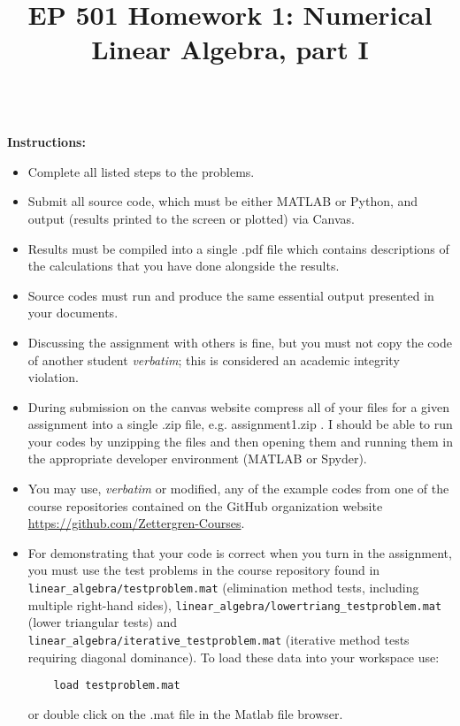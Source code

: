 \documentclass{article}
\begin{document}
\title{EP 501 Homework 1:  Numerical Linear Algebra, part I}

\maketitle

~\\
\textbf{Instructions:}  
\begin{itemize}
  \item Complete all listed steps to the problems.
  \item Submit all source code, which must be either MATLAB or Python, and output (results printed to the screen or plotted) via Canvas.  
  \item Results must be compiled into a single .pdf file which contains descriptions of the calculations that you have done alongside the results.  
  \item Source codes must run and produce the same essential output presented in your documents.  
  \item Discussing the assignment with others is fine, but you must not copy the code of another student \emph{verbatim}; this is considered an academic integrity violation.  
  \item During submission on the canvas website compress all of your files for a given assignment into a single .zip file, e.g. \textsf{assignment1.zip} .  I should be able to run your codes by unzipping the files and then opening them and running them in the appropriate developer environment (MATLAB or Spyder).  
  \item You may use, \emph{verbatim} or modified, any of the example codes from one of the course repositories contained on the GitHub organization website  \url{https://github.com/Zettergren-Courses}.
  \item For demonstrating that your code is correct when you turn in the assignment, you must use the test problems in the course repository found in \texttt{linear\_algebra/testproblem.mat} (elimination method tests, including multiple right-hand sides), \texttt{linear\_algebra/lowertriang\_testproblem.mat} (lower triangular tests) and \\ \texttt{linear\_algebra/iterative\_testproblem.mat} (iterative method tests requiring diagonal dominance).  To load these data into your workspace use:
    \begin{verbatim}
    load testproblem.mat
    \end{verbatim}
    or double click on the .mat file in the Matlab file browser.  
\end{itemize}
\end{document}
